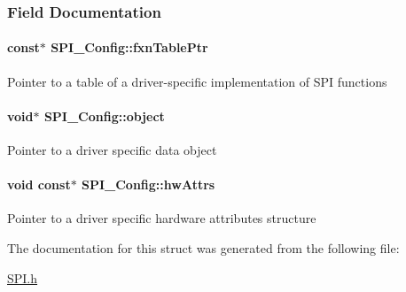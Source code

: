 \subsubsection{Field Documentation}
\paragraph[{fxn\-Table\-Ptr}]{ const$\ast$ S\-P\-I\-\_\-\-Config\-::fxn\-Table\-Ptr}\label{struct_s_p_i___config_a099238ad6e5c2ca2d38f041624362636}
Pointer to a table of a driver-\/specific implementation of S\-P\-I functions 
\paragraph[{object}]{\setlength{\rightskip}{0pt plus 5cm}void$\ast$ S\-P\-I\-\_\-\-Config\-::object}\label{struct_s_p_i___config_a35884e199911642a791e9a422dfccba6}
Pointer to a driver specific data object 
\paragraph[{hw\-Attrs}]{\setlength{\rightskip}{0pt plus 5cm}void const$\ast$ S\-P\-I\-\_\-\-Config\-::hw\-Attrs}\label{struct_s_p_i___config_a4c8bfac4e9152b4e1da78f4926ecd4db}
Pointer to a driver specific hardware attributes structure 

The documentation for this struct was generated from the following file\-:\begin{DoxyCompactItemize}
\item 
\hyperlink{_s_p_i_8h}{S\-P\-I.\-h}\end{DoxyCompactItemize}
